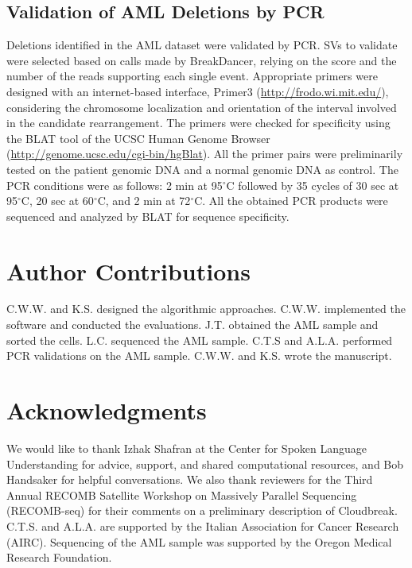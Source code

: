 \documentclass[11pt]{article}
\newcommand{\degree}{\ensuremath{^\circ}}
\begin{document}
\subsection{Validation of AML Deletions by PCR}

Deletions identified in the AML dataset were validated by PCR. SVs to validate were selected based on calls made by BreakDancer, relying on the score and the number of the reads supporting each single event. Appropriate primers were designed with an internet-based interface, Primer3 (\url{http://frodo.wi.mit.edu/}), considering the chromosome localization and orientation of the interval involved in the candidate rearrangement. The primers were checked for specificity using the BLAT tool of the UCSC Human Genome Browser (\url{http://genome.ucsc.edu/cgi-bin/hgBlat}). All the primer pairs were preliminarily tested on the patient genomic DNA and a normal genomic DNA as control. The PCR conditions were as follows: 2 min at 95\degree C followed by 35 cycles of 30 sec at 95\degree C, 20 sec at 60\degree C, and 2 min at 72\degree C. All the obtained PCR products were sequenced and analyzed by BLAT for sequence specificity. 


\newpage

\section{Author Contributions}

C.W.W. and K.S. designed the algorithmic approaches. C.W.W. implemented the software and conducted the evaluations. J.T. obtained the AML sample and sorted the cells. L.C. sequenced the AML sample. C.T.S and A.L.A. performed PCR validations on the AML sample. C.W.W. and K.S. wrote the manuscript.

\section*{Acknowledgments}

We would like to thank Izhak Shafran at the Center for Spoken Language Understanding for advice, support, and shared computational resources, and Bob Handsaker for helpful conversations. We also thank reviewers for the Third Annual RECOMB Satellite Workshop on Massively Parallel Sequencing (RECOMB-seq) for their comments on a preliminary description of Cloudbreak. C.T.S. and A.L.A. are supported by the Italian Association for Cancer Research (AIRC). Sequencing of the AML sample was supported by the Oregon Medical Research Foundation. 

\printbibliography
\end{document}

